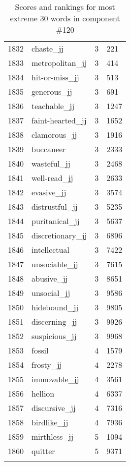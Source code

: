 \begin{longtable}[!htbp]{| rlr@{.}l |}
    1832 & chaste\_jj & 3 & 221 \\
    1833 & metropolitan\_jj & 3 & 414 \\
    1834 & hit-or-miss\_jj & 3 & 513 \\
    1835 & generous\_jj & 3 & 691 \\
    1836 & teachable\_jj & 3 & 1247 \\
    1837 & faint-hearted\_jj & 3 & 1652 \\
    1838 & clamorous\_jj & 3 & 1916 \\
    1839 & buccaneer & 3 & 2333 \\
    1840 & wasteful\_jj & 3 & 2468 \\
    1841 & well-read\_jj & 3 & 2633 \\
    1842 & evasive\_jj & 3 & 3574 \\
    1843 & distrustful\_jj & 3 & 5235 \\
    1844 & puritanical\_jj & 3 & 5637 \\
    1845 & discretionary\_jj & 3 & 6896 \\
    1846 & intellectual & 3 & 7422 \\
    1847 & unsociable\_jj & 3 & 7615 \\
    1848 & abusive\_jj & 3 & 8651 \\
    1849 & unsocial\_jj & 3 & 9586 \\
    1850 & hidebound\_jj & 3 & 9805 \\
    1851 & discerning\_jj & 3 & 9926 \\
    1852 & suspicious\_jj & 3 & 9968 \\
    1853 & fossil & 4 & 1579 \\
    1854 & frosty\_jj & 4 & 2278 \\
    1855 & immovable\_jj & 4 & 3561 \\
    1856 & hellion & 4 & 6337 \\
    1857 & discursive\_jj & 4 & 7316 \\
    1858 & birdlike\_jj & 4 & 7936 \\
    1859 & mirthless\_jj & 5 & 1094 \\
    1860 & quitter & 5 & 9371 \\
    \hline
    \caption{Scores and rankings for most extreme 30 words in component \#120} \\
\end{longtable}
